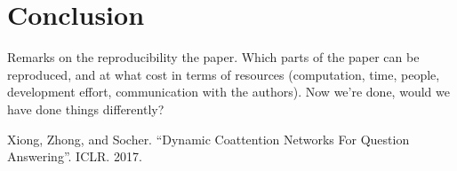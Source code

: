 \documentclass[letterpaper, 10 pt, conference]{ieeeconf}  %
\begin{document}
\section{Conclusion}

Remarks on the reproducibility the paper. Which parts of the paper can be reproduced, and at what cost in terms of resources (computation, time, people, development effort, communication with the authors). Now we’re done, would we have done things differently?










\begin{thebibliography}{99}

 Xiong, Zhong, and Socher. ``Dynamic Coattention Networks For Question Answering''. ICLR. 2017.


\end{thebibliography}
\end{document}
